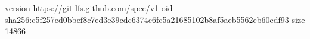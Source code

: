 version https://git-lfs.github.com/spec/v1
oid sha256:c5f257ed0bbef8c7ed3e39cdc6374c6fc5a21685102b8af5aeb5562eb60edf93
size 14866
